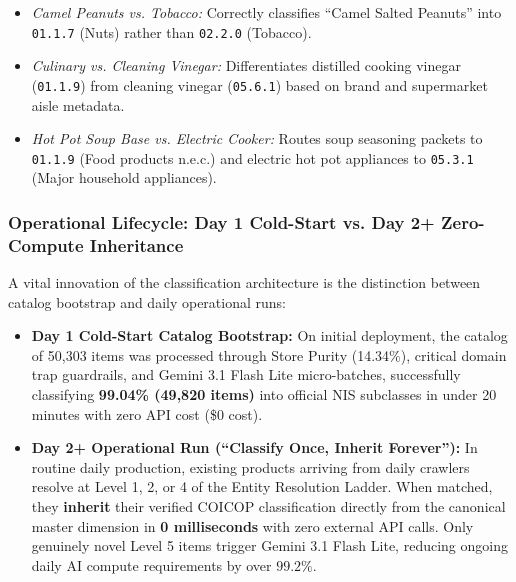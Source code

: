 \begin{itemize}
\begin{itemize}[noitemsep]
        \item \textit{Camel Peanuts vs. Tobacco:} Correctly classifies ``Camel Salted Peanuts'' into \texttt{01.1.7} (Nuts) rather than \texttt{02.2.0} (Tobacco).
        \item \textit{Culinary vs. Cleaning Vinegar:} Differentiates distilled cooking vinegar (\texttt{01.1.9}) from cleaning vinegar (\texttt{05.6.1}) based on brand and supermarket aisle metadata.
        \item \textit{Hot Pot Soup Base vs. Electric Cooker:} Routes soup seasoning packets to \texttt{01.1.9} (Food products n.e.c.) and electric hot pot appliances to \texttt{05.3.1} (Major household appliances).
    \end{itemize}
\end{itemize}

\subsubsection{Operational Lifecycle: Day 1 Cold-Start vs. Day 2+ Zero-Compute Inheritance}
\hs A vital innovation of the classification architecture is the distinction between catalog bootstrap and daily operational runs:
\begin{itemize}
    \item \textbf{Day 1 Cold-Start Catalog Bootstrap:} On initial deployment, the catalog of 50,303 items was processed through Store Purity (14.34\%), critical domain trap guardrails, and Gemini 3.1 Flash Lite micro-batches, successfully classifying \textbf{99.04\% (49,820 items)} into official NIS subclasses in under 20 minutes with zero API cost (\$0 cost).
    \item \textbf{Day 2+ Operational Run (``Classify Once, Inherit Forever''):} In routine daily production, existing products arriving from daily crawlers resolve at Level 1, 2, or 4 of the Entity Resolution Ladder. When matched, they \textbf{inherit} their verified COICOP classification directly from the canonical master dimension in \textbf{0 milliseconds} with zero external API calls. Only genuinely novel Level 5 items trigger Gemini 3.1 Flash Lite, reducing ongoing daily AI compute requirements by over $99.2\%$.
\end{itemize}

